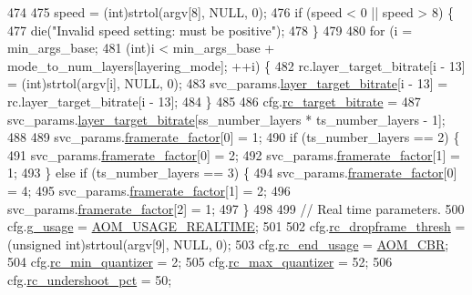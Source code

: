 \begin{DoxyCodeInclude}
{{{{{{{{{{{{{474 
475   speed = (int)strtol(argv[8], NULL, 0);
476   \textcolor{keywordflow}{if} (speed < 0 || speed > 8) \{
477     die(\textcolor{stringliteral}{"Invalid speed setting: must be positive"});
478   \}
479 
480   \textcolor{keywordflow}{for} (i = min\_args\_base;
481        (int)i < min\_args\_base + mode\_to\_num\_layers[layering\_mode]; ++i) \{
482     rc.layer\_target\_bitrate[i - 13] = (int)strtol(argv[i], NULL, 0);
483     svc\_params.\hyperlink{structaom__svc__params_a524061efd3e5cb962d364d0d20fd1433}{layer\_target\_bitrate}[i - 13] = rc.layer\_target\_bitrate[i - 13];
484   \}
485 
486   cfg.\hyperlink{structaom__codec__enc__cfg_ab21539da477dba7506d90353c27d218b}{rc\_target\_bitrate} =
487       svc\_params.\hyperlink{structaom__svc__params_a524061efd3e5cb962d364d0d20fd1433}{layer\_target\_bitrate}[ss\_number\_layers * ts\_number\_layers - 1];
488 
489   svc\_params.\hyperlink{structaom__svc__params_a52a517b31b478cbd4b60d690979cc314}{framerate\_factor}[0] = 1;
490   \textcolor{keywordflow}{if} (ts\_number\_layers == 2) \{
491     svc\_params.\hyperlink{structaom__svc__params_a52a517b31b478cbd4b60d690979cc314}{framerate\_factor}[0] = 2;
492     svc\_params.\hyperlink{structaom__svc__params_a52a517b31b478cbd4b60d690979cc314}{framerate\_factor}[1] = 1;
493   \} \textcolor{keywordflow}{else} \textcolor{keywordflow}{if} (ts\_number\_layers == 3) \{
494     svc\_params.\hyperlink{structaom__svc__params_a52a517b31b478cbd4b60d690979cc314}{framerate\_factor}[0] = 4;
495     svc\_params.\hyperlink{structaom__svc__params_a52a517b31b478cbd4b60d690979cc314}{framerate\_factor}[1] = 2;
496     svc\_params.\hyperlink{structaom__svc__params_a52a517b31b478cbd4b60d690979cc314}{framerate\_factor}[2] = 1;
497   \}
498 
499   \textcolor{comment}{// Real time parameters.}
500   cfg.\hyperlink{structaom__codec__enc__cfg_a2aef2cdcf97e60ab36f7ca77c028e816}{g\_usage} = \hyperlink{group__encoder_gae2cc24d3083099df8eb60ad65f81c62f}{AOM\_USAGE\_REALTIME};
501 
502   cfg.\hyperlink{structaom__codec__enc__cfg_a0b64b07e9238ee51f6195b1bbb7cd2fd}{rc\_dropframe\_thresh} = (\textcolor{keywordtype}{unsigned} int)strtoul(argv[9], NULL, 0);
503   cfg.\hyperlink{structaom__codec__enc__cfg_a3fd74d888658039d09bc4eacf163a495}{rc\_end\_usage} = \hyperlink{group__encoder_gga7c084d3ecef569aad166ce70b0e8a957a14b6057d61c61e6117f5af16dcf89b0c}{AOM\_CBR};
504   cfg.\hyperlink{structaom__codec__enc__cfg_aa5c6cede8c820ef29fc3c106aa1227eb}{rc\_min\_quantizer} = 2;
505   cfg.\hyperlink{structaom__codec__enc__cfg_a8f8851455e06db026022d4b01671b122}{rc\_max\_quantizer} = 52;
506   cfg.\hyperlink{structaom__codec__enc__cfg_a8695946812f24f3719aed80cff00aa29}{rc\_undershoot\_pct} = 50;
}}}}}}}}}}}}}
\end{DoxyCodeInclude}
